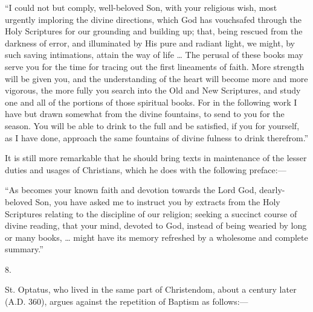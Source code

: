 ``I could not but comply, well-beloved Son, with your religious
wish, most urgently imploring the divine directions, which God has
vouchsafed through the Holy Scriptures for our grounding and building
up; that, being rescued from the darkness of error, and illuminated by
His pure and radiant light, we might, by such saving intimations,
attain the way of life … The perusal of these books may serve you
for the time for tracing out the first lineaments of faith. More
strength will be given you, and the understanding of the heart will
become more and more vigorous, the more fully you search into the Old
and New Scriptures, and study one and all of the portions of those
spiritual books. For in the following work I have but drawn somewhat
from the divine fountains, to send to you for the season. You will be
able to drink to the full and be satisfied, if you for yourself, as I
have done, approach the same fountains of divine fulness to drink
therefrom.''

It is still more remarkable that he should bring texts in
maintenance of the lesser duties and usages of Christians, which he
does with the following preface:—

``As becomes your known faith and devotion towards the Lord
God, dearly-beloved Son, you have asked me to instruct you by extracts
from the Holy Scriptures relating to the discipline of our religion;
seeking a succinct course of divine reading, that your mind, devoted
to God, instead of being wearied by long or many books, … might have
its memory refreshed by a wholesome and complete summary.''

8.

St. Optatus, who lived in the same part of Christendom, about a
century later (A.D. 360), argues against the
repetition of Baptism as follows:—

